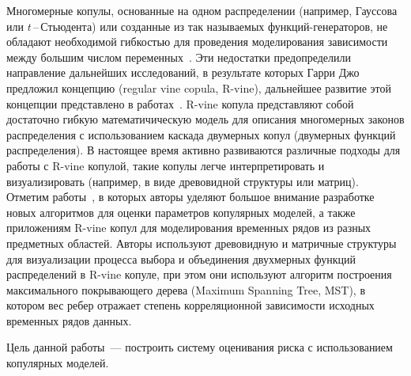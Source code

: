 Многомерные копулы, основанные на одном распределении (например, Гауссова или $t$\,--\,Стьюдента) или созданные из так называемых функций-генераторов, не обладают необходимой гибкостью для проведения моделирования зависимости между большим числом переменных~\cite{Brechmann2013}. Эти недостатки предопределили направление дальнейших исследований, в результате которых Гарри Джо~\cite{Joe1996} предложил  концепцию  (regular vine copula, R-vine), дальнейшее развитие этой концепции представлено в работах~\cite{Brechmann2013, Cooke2015}.
R-vine копула представляют собой достаточно гибкую математичическую модель для описания многомерных законов распределения с использованием каскада двумерных копул (двумерных функций распределения). 
В настоящее время активно развиваются различные подходы для работы с R-vine копулой, такие копулы легче интерпретировать и визуализировать (например, в виде древовидной структуры или матриц). 
Отметим работы~\cite{Cooke2015, Czado2010, Dissmann2013}, в которых авторы уделяют большое внимание разработке новых алгоритмов для оценки параметров копулярных моделей, а также  приложениям R-vine копул для моделирования временных рядов из разных предметных областей.
Авторы используют древовидную и матричные структуры для визуализации процесса выбора и объединения двухмерных функций распределений в R-vine копуле, при этом они используют алгоритм построения максимального покрывающего дерева (Maximum Spanning Tree, MST), в котором вес ребер отражает степень корреляционной зависимости исходных временных рядов данных.




Цель данной работы~--- построить систему оценивания риска с использованием копулярных моделей.

